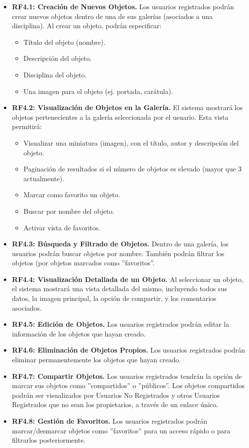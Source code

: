 \begin{itemize}
    \item \textbf{RF4.1: Creación de Nuevos Objetos.} Los usuarios registrados podrán crear nuevos objetos dentro de una de sus galerías (asociados a una disciplina). Al crear un objeto, podrán especificar:
    \begin{itemize}
        \item Título del objeto (nombre).
        \item Descripción del objeto.
        \item Disciplina del objeto.
        \item Una imagen para el objeto (ej. portada, carátula).
    \end{itemize}
    \item \textbf{RF4.2: Visualización de Objetos en la Galería.} El sistema mostrará los objetos pertenecientes a la galería seleccionada por el usuario. Esta vista permitirá:
    \begin{itemize}
        \item Visualizar una miniatura (imagen), con el título, autor y descripción del objeto.
        \item Paginación de resultados si el número de objetos es elevado (mayor que 3 actualmente).
        \item Marcar como favorito un objeto.
        \item Buscar por nombre del objeto.
        \item Activar vista de favoritos.
    \end{itemize}
    \item \textbf{RF4.3: Búsqueda y Filtrado de Objetos.} Dentro de una galería, los usuarios podrán buscar objetos por nombre. También podrán filtrar los objetos (por objetos marcados como ''favoritos''.
    \item \textbf{RF4.4: Visualización Detallada de un Objeto.} Al seleccionar un objeto, el sistema mostrará una vista detallada del mismo, incluyendo todos sus datos, la imagen principal, la opción de compartir, y los comentarios asociados.
    \item \textbf{RF4.5: Edición de Objetos.} Los usuarios registrados podrán editar la información de los objetos que hayan creado.
    \item \textbf{RF4.6: Eliminación de Objetos Propios.} Los usuarios registrados podrán eliminar permanentemente los objetos que hayan creado.
    \item \textbf{RF4.7: Compartir Objetos.} Los usuarios registrados tendrán la opción de marcar sus objetos como ''compartidos'' o ''públicos''. Los objetos compartidos podrán ser visualizados por Usuarios No Registrados y otros Usuarios Registrados que no sean los propietarios, a través de un enlace único.
    \item \textbf{RF4.8: Gestión de Favoritos.} Los usuarios registrados podrán marcar/desmarcar objetos como ''favoritos'' para un acceso rápido o para filtrarlos posteriormente.
\end{itemize}

